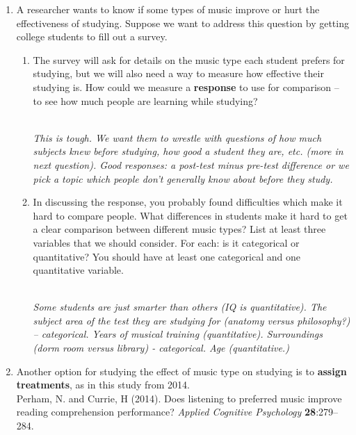\begin{enumerate}
\item A researcher wants to know if some types of music  improve or
  hurt the effectiveness of studying.  Suppose we want to address
  this question by getting college students to fill out a survey.
  \begin{enumerate}
  \item \label{response1} The survey will ask for details on the music
    type each student
    prefers for studying, but we will also need a way to measure how
    effective their studying is.  How could we measure a {\bf
      response} to use for comparison --  to see how much people are
    learning while studying?
\begin{students}
        \vspace{3cm}
\end{students}
\begin{key}
  \\ {\it This is tough. We want them to wrestle with questions of how
  much subjects knew before studying, how good a student they are, etc.
  (more in next question).  Good responses:  a post-test
  minus pre-test difference or we pick a topic which
  people don't generally know about before they study.}
\end{key}
     \item\label{lurking} In discussing the response, you probably
       found difficulties which make it hard to compare people.  What
       differences in students 
       make it hard to get a clear comparison between different music
       types?  List at least three variables that we should consider.
       For each: is it categorical or quantitative?  You should have at
       least one categorical and one quantitative variable.
\begin{students}
        \vspace{5cm}
\end{students}
\begin{key}
  \\ {\it Some students are just smarter than others (IQ is
    quantitative). The subject area of the test they are studying for (anatomy
    versus philosophy?) -- categorical. Years of musical training
    (quantitative). Surroundings (dorm room versus library) -
    categorical. Age (quantitative.) }
\end{key}
  \end{enumerate}
\item Another option for studying the effect of music type on studying is
  to {\bf assign treatments}, as in this study from 2014.  \\
   Perham, N. and Currie, H (2014). Does listening to preferred music
   improve reading comprehension performance? {\em Applied Cognitive
     Psychology} {\bf 28}:279--284.


\end{enumerate}
